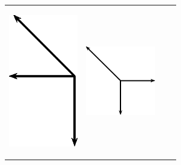 \begin{enumerate}[noitemsep, label=\textbf{\arabic*}. ]
\begin{center}
\begin{xtabular*}{\mytablewidth}[t]{|p{10\mystarwidth}|p{10\mystarwidth}|p{10\mystarwidth}|p{10\mystarwidth}|}
    
        
    \setcounter{subfigure}{0}

\label{m38819*id197110}
    \begin{center}
    \label{m38819*id197110!!!underscore!!!media}\label{m38819*id197110!!!underscore!!!printimage}\includegraphics[width=3cm]{col11305.imgs/m38819_PG11C1_073.png} %
        
      \vspace{2pt}
    \vspace{.1in}
    
    \end{center}



    \addtocounter{footnote}{-0}
     &
    
    
        
    \setcounter{subfigure}{0}

\label{m38819*id197121}
    \begin{center}
    \label{m38819*id197121!!!underscore!!!media}\label{m38819*id197121!!!underscore!!!printimage}\includegraphics[width=3cm]{col11305.imgs/m38819_PG11C1_074.png} %
        
      \vspace{2pt}
    \vspace{.1in}
    

\end{center}
\end{xtabular*}
\end{center}
\end{enumerate}
